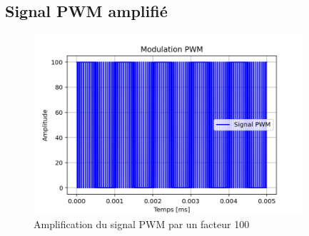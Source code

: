 \documentclass[a4paper,12pt,oneside]{report}	%
\begin{document}
        \subsection{Signal PWM amplifié}
            \begin{figure}[h!]
                \centering
                \includegraphics[width = 10cm]{images/1.3.1 - ampl_PWM btw cos and tri.png}
                \caption{Amplification du signal PWM par un facteur 100}
                \label{fig:PWM_amp}
            \end{figure}
\newpage 
\end{document}
